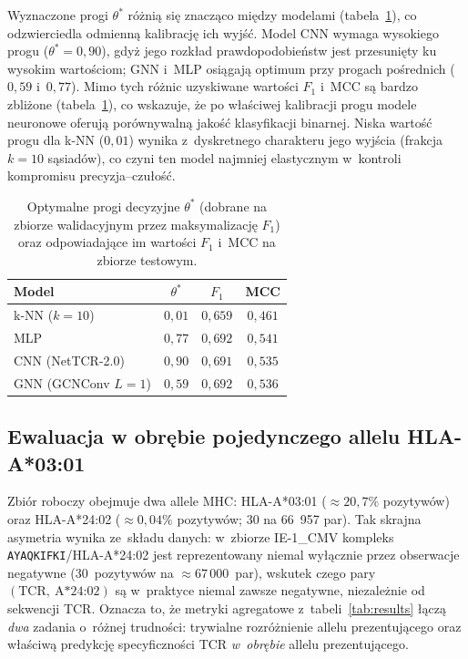 \documentclass{SGGW-thesis}
\begin{document}
Wyznaczone progi $\theta^*$ różnią się znacząco między modelami (tabela~\ref{tab:thresholds}),
co odzwierciedla odmienną kalibrację ich wyjść. Model CNN wymaga wysokiego progu ($\theta^* = 0{,}90$),
gdyż jego rozkład prawdopodobieństw jest przesunięty ku wysokim wartościom; GNN i~MLP osiągają
optimum przy progach pośrednich ($0{,}59$ i~$0{,}77$). Mimo tych różnic uzyskiwane wartości $F_1$
i~MCC są bardzo zbliżone (tabela~\ref{tab:thresholds}), co wskazuje, że po właściwej kalibracji
progu modele neuronowe oferują porównywalną jakość klasyfikacji binarnej. Niska wartość progu dla
k-NN ($0{,}01$) wynika z~dyskretnego charakteru jego wyjścia (frakcja $k{=}10$ sąsiadów), co czyni
ten model najmniej elastycznym w~kontroli kompromisu precyzja--czułość.

\begin{table}[htbp]
\centering
\small
\caption{Optymalne progi decyzyjne $\theta^*$ (dobrane na zbiorze walidacyjnym przez maksymalizację
$F_1$) oraz odpowiadające im wartości $F_1$ i~MCC na zbiorze testowym.}
\label{tab:thresholds}
\begin{tabular}{lccc}
\toprule
\textbf{Model} & \textbf{$\theta^*$} & \textbf{$F_1$} & \textbf{MCC} \\
\midrule
k-NN ($k{=}10$)      & $0{,}01$ & $0{,}659$ & $0{,}461$ \\
MLP                  & $0{,}77$ & $0{,}692$ & $0{,}541$ \\
CNN (NetTCR-2.0)     & $0{,}90$ & $0{,}691$ & $0{,}535$ \\
GNN (GCNConv $L{=}1$) & $0{,}59$ & $0{,}692$ & $0{,}536$ \\
\bottomrule
\end{tabular}
\end{table}

\subsection{Ewaluacja w obrębie pojedynczego allelu HLA-A*03:01}
\label{sec:within_allele}

Zbiór roboczy obejmuje dwa allele MHC: HLA-A*03:01 (${\approx}20{,}7\%$ pozytywów)
oraz HLA-A*24:02 (${\approx}0{,}04\%$ pozytywów; 30 na 66~957 par). Tak skrajna
asymetria wynika ze~składu danych: w~zbiorze IE-1\_CMV kompleks \texttt{AYAQKIFKI}/HLA-A*24:02
jest reprezentowany niemal wyłącznie przez obserwacje negatywne (30~pozytywów na ${\approx}67\,000$~par),
wskutek czego pary $(\text{TCR},\ \text{A*24:02})$ są w~praktyce niemal zawsze negatywne,
niezależnie od sekwencji TCR. Oznacza to, że
metryki agregatowe z~tabeli~\ref{tab:results} łączą \textit{dwa} zadania o~różnej
trudności: trywialne rozróżnienie allelu prezentującego oraz właściwą predykcję
specyficzności TCR \textit{w~obrębie} allelu prezentującego.
\end{document}
